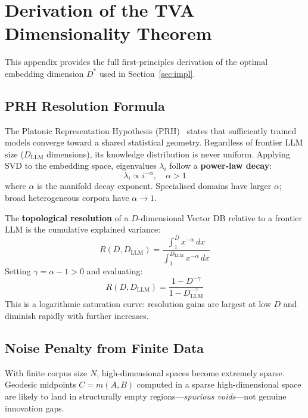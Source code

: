 \documentclass[11pt,twocolumn]{article}
\begin{document}
\appendix
\section{Derivation of the TVA Dimensionality Theorem}
\label{sec:appendix_dim}

This appendix provides the full first-principles derivation of the
optimal embedding dimension $D^*$ used in Section~\ref{sec:impl}.

\subsection{PRH Resolution Formula}

The Platonic Representation Hypothesis (PRH)~\cite{huh2024platonic}
states that sufficiently trained models converge toward a shared
statistical geometry.  Regardless of frontier LLM size
($D_{\mathrm{LLM}}$ dimensions), its knowledge distribution is
never uniform.  Applying SVD to the embedding space, eigenvalues
$\lambda_i$ follow a \textbf{power-law decay}:
\[
  \lambda_i \propto i^{-\alpha}, \quad \alpha > 1
\]
where $\alpha$ is the manifold decay exponent.  Specialised domains
have larger $\alpha$; broad heterogeneous corpora have $\alpha \to 1$.

The \textbf{topological resolution} of a $D$-dimensional Vector DB
relative to a frontier LLM is the cumulative explained variance:
\[
  R(D, D_{\mathrm{LLM}}) =
  \frac{\displaystyle\int_1^{D} x^{-\alpha}\,dx}
       {\displaystyle\int_1^{D_{\mathrm{LLM}}} x^{-\alpha}\,dx}
\]
Setting $\gamma = \alpha - 1 > 0$ and evaluating:
\begin{equation}
  \boxed{R(D, D_{\mathrm{LLM}}) = \frac{1 - D^{-\gamma}}{1 - D_{\mathrm{LLM}}^{-\gamma}}}
  \label{eq:resolution}
\end{equation}
This is a logarithmic saturation curve: resolution gains are largest
at low $D$ and diminish rapidly with further increases.

\subsection{Noise Penalty from Finite Data}

With finite corpus size $N$, high-dimensional spaces become extremely
sparse.  Geodesic midpoints $C = m(A,B)$ computed in a sparse
high-dimensional space are likely to land in structurally empty
regions---\emph{spurious voids}---not genuine innovation gaps.
\end{document}
